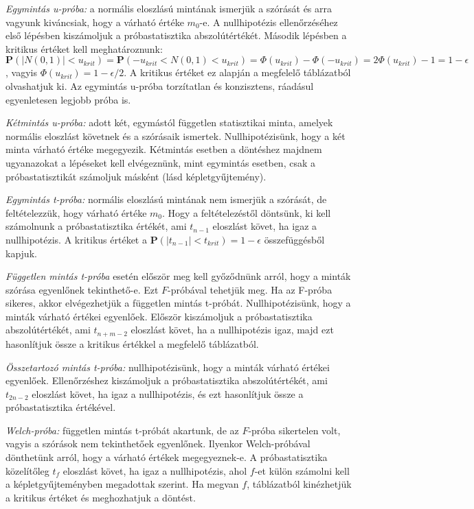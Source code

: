 \emph{Egymintás u-próba:} a normális eloszlású mintának ismerjük a szórását és arra vagyunk kiváncsiak, hogy a várható értéke $m_0$-e. A nullhipotézis ellenőrzéséhez első lépésben kiszámoljuk a próbastatisztika abszolútértékét. Második lépésben a kritikus értéket kell meghatároznunk: $\mathbf{P}(|N(0,1)| < u_{krit})= \mathbf{P}(-u_{krit} < N(0,1) < u_{krit}) = \Phi(u_{krit}) - \Phi(-u_{krit}) = 2 \Phi(u_{krit}) -1 = 1-\epsilon$, vagyis $\Phi(u_{krit}) = 1-\epsilon/2$. A kritikus értéket ez alapján a megfelelő táblázatból olvashatjuk ki. Az egymintás u-próba torzítatlan és konzisztens, ráadásul egyenletesen legjobb próba is.

\emph{Kétmintás u-próba:} adott két, egymástól független statisztikai minta, amelyek normális eloszlást követnek és a szórásaik ismertek. Nullhipotézisünk, hogy a két minta várható értéke megegyezik. Kétmintás esetben a döntéshez majdnem ugyanazokat a lépéseket kell elvégeznünk, mint egymintás esetben, csak a próbastatisztikát számoljuk másként (lásd képletgyűjtemény).

\emph{Egymintás t-próba:} normális eloszlású mintának nem ismerjük a szórását, de feltételezzük, hogy várható értéke $m_0$. Hogy a feltételezéstől döntsünk, ki kell számolnunk a próbastatisztika értékét, ami $t_{n-1}$ eloszlást követ, ha igaz a nullhipotézis. A kritikus értéket a $\mathbf{P}(|t_{n-1}| < t_{krit}) = 1-\epsilon$ összefüggésből kapjuk.

\emph{Független mintás t-próba} esetén először meg kell győződnünk arról, hogy a minták szórása egyenlőnek tekinthető-e. Ezt $F$-próbával tehetjük meg. Ha az F-próba sikeres, akkor elvégezhetjük a független mintás t-próbát. Nullhipotézisünk, hogy a minták várható értékei egyenlőek. Először kiszámoljuk a próbastatisztika abszolútértékét, ami $t_{n+m-2}$ eloszlást követ, ha a nullhipotézis igaz, majd ezt hasonlítjuk össze a kritikus értékkel a megfelelő táblázatból. 

\emph{Összetartozó mintás t-próba:} nullhipotézisünk, hogy a minták várható értékei egyenlőek. Ellenőrzéshez kiszámoljuk a próbastatisztika abszolútértékét, ami $t_{2n-2}$ eloszlást követ, ha igaz a nullhipotézis, és ezt hasonlítjuk össze a próbastatisztika értékével.

\emph{Welch-próba:} független mintás t-próbát akartunk, de az $F$-próba sikertelen volt, vagyis a szórások nem tekinthetőek egyenlőnek. Ilyenkor Welch-próbával dönthetünk arról, hogy a várható értékek megegyeznek-e. A próbastatisztika közelítőleg $t_f$ eloszlást követ, ha igaz a nullhipotézis, ahol $f$-et külön számolni kell a képletgyűjteményben megadottak szerint. Ha megvan $f$, táblázatból kinézhetjük a kritikus értéket és meghozhatjuk a döntést.

